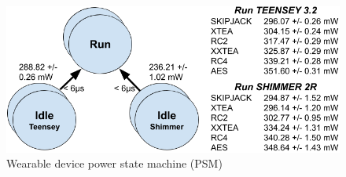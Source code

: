 \documentclass[journal]{IEEEtran}
\begin{document}
\begin{figure}[tbh]
 \vspace{-0.3cm}
 \centering
 \includegraphics[scale=0.25]{Figures/PSM_Geral.png}
 \caption{ Wearable device power state machine (PSM)}
 \label{fig:PSM_geral}
 \vspace{-0.3cm}
\end{figure}
\end{document}
